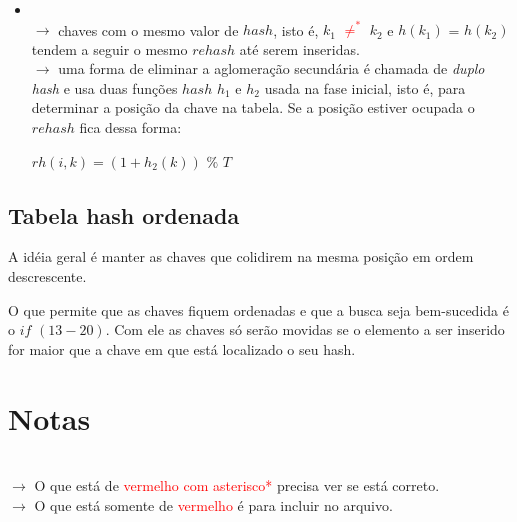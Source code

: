 \documentclass[a4paper, 12pt]{article}
\begin{document}
\begin{itemize}
\begin{itemize}
\item {}\\
$\rightarrow$ chaves com o mesmo valor de $hash$, isto é, $k_{1}$ \textcolor{red}{$\neq^*$} $k_{2}$ e $h(k_{1})$ = $h(k_{2})$ tendem a seguir o mesmo $rehash$ até serem inseridas.\\
$\rightarrow$ uma forma de eliminar a aglomeração secundária é chamada de \emph{duplo hash} e usa duas funções $hash$ $h_{1}$ e $h_{2}$ usada na fase inicial, isto é, para determinar a posição da chave na tabela. Se a posição estiver ocupada o $rehash$ fica dessa forma:
\begin{center}
$rh(i, k) = (1 + h_{2}(k))$ $\%$ $T$
\end{center}
\end{itemize}

\end{itemize}
\pagebreak

\subsection{Tabela hash ordenada}

A idéia geral é manter as chaves que colidirem na mesma posição em ordem descrescente.

\begin{algorithmic}[1]
\EndWhile
{}
	\color{BlueViolet}
		\color{black}
		\EndIf
	\color{BlueViolet}
	\EndIf
	\color{black}
	
\EndWhile
{}
\EndIf
{}
	\State {}
\Else
	\State {}
\EndIf

\end{algorithmic}

O que permite que as chaves fiquem ordenadas e que a busca seja bem-sucedida é o $if$ $(13-20)$. Com ele as chaves só serão movidas se o elemento a ser inserido for maior que a chave em que está localizado o seu hash.
\pagebreak

\section{Notas}
\textcolor{white}{.}\\
$\rightarrow$ O que está de \textcolor{red}{vermelho com asterisco*} precisa ver se está correto.\\
$\rightarrow$ O que está somente de \textcolor{red}{vermelho} é para incluir no arquivo.
\end{document}

